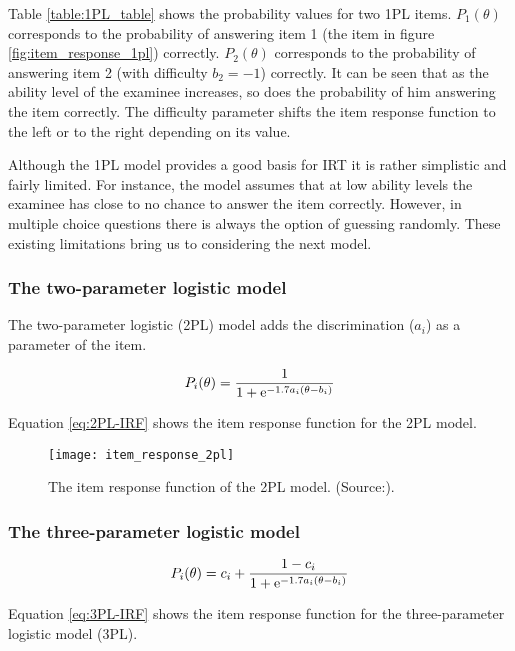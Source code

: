 Table \ref{table:1PL_table} shows the probability values for two 1PL items. $P_1(\theta)$ corresponds to the probability of answering item 1 (the item in figure \ref{fig:item_response_1pl}) correctly. $P_2(\theta)$ corresponds to the probability of answering item 2 (with difficulty $b_2=-1$) correctly. It can be seen that as the ability level of the examinee increases, so does the probability of him answering the item correctly. The difficulty parameter shifts the item response function to the left or to the right depending on its value. \newline

Although the 1PL model provides a good basis for IRT it is rather simplistic and fairly limited. For instance, the model assumes that at low ability levels the examinee has close to no chance to answer the item correctly. However, in multiple choice questions there is always the option of guessing randomly. These existing limitations bring us to considering the next model.

\subsubsection{The two-parameter logistic model}
The two-parameter logistic (2PL) model adds the discrimination ($a_i$) as a parameter of the item.

\begin{equation} \label{eq:2PL-IRF}
P_i(\theta) = \frac{1}{1 + \mathrm{e}^{-1.7a_i(\theta - b_i)}}
\end{equation}

Equation \eqref{eq:2PL-IRF} shows the item response function for the 2PL model.

\begin{figure}[H]
\centering
\texttt{[image: item\_response\_2pl]}
\caption{The item response function of the 2PL model. (Source:\cite{Visual-IRT}).}
\label{fig:item_response_2pl}
\end{figure}

\subsubsection{The three-parameter logistic model}
\begin{equation} \label{eq:3PL-IRF}
P_i(\theta) = c_i + \frac{1 - c_i}{1 + \mathrm{e}^{-1.7a_i(\theta - b_i)}}
\end{equation}

Equation \eqref{eq:3PL-IRF} shows the item response function for the three-parameter logistic model (3PL).

